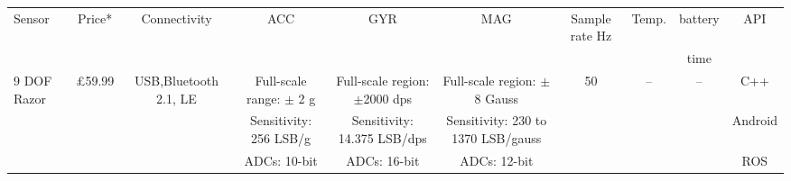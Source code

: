  \begin{landscape}
 \tiny

 \begin{tabular}{l*{9}{c}}
 Sensor   & Price* & Connectivity & ACC  & GYR   & MAG   & Sample rate  Hz & Temp. & battery & API  \\
    &  &  & &    &    &  &  & time &   \\


    \hline
    9 DOF Razor &  \pounds 59.99 & USB,Bluetooth 2.1, LE & Full-scale range: $\pm$ 2 g  & Full-scale region: $\pm$2000 dps
     &  Full-scale region: $\pm$8 Gauss  & 50  & -- & -- & C++  \\
     &   &   &  Sensitivity: 256 LSB/g & Sensitivity: 14.375 LSB/dps &  Sensitivity: 230 to 1370 LSB/gauss &  &  & & Android    \\
     &   &  & ADCs: 10-bit & ADCs: 16-bit &  ADCs: 12-bit &  &  & & ROS \\
















\end{tabular}
\end{landscape}
